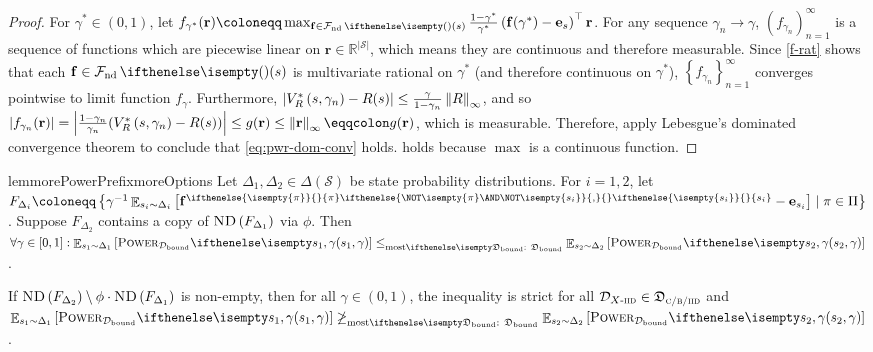 \documentclass{article}
\renewcommand{\abs}[1]{\left|#1\right|}
\newcommand*{\prn}[1]{\left(#1\right)}
\newcommand*{\brx}[1]{\left[#1\right]}
\renewcommand{\set}[1]{\left\{#1\right\}}
\newcommand*{\defeq}{\coloneqq} %
\newcommand*{\eqdef}{\eqqcolon} %
\newcommand*{\reals}{\mathbb{R}}
\newcommand*{\unitvec}[1][s]{\mathbf{e}_{#1}}
\newcommand*{\upsc}[1]{\text{\upshape\textsc{#1}}}
\newcommand*{\St}{\mathcal{S}}
\newcommand*{\rf}{\mathbf{r}} %
\newcommand*{\rewardVS}{\reals^{\abs{\St}}} %
\newcommand*{\D}{\mathcal{D}} %
\newcommand*{\distSet}{\mathfrak{D}}
\newcommand*{\DSetBCiid}{\distSet_{\textsc{c/b/}\iid}}
\newcommand*{\Dbd}{\D_{\text{bound}}}
\newcommand*{\DSetBd}{\distSet_\text{bound}}
\DeclareMathOperator*{\opE}{\mathbb{E}}
\newcommand*{\E}[2]{\opE_{#1}\brx{#2}} %
\newcommand*{\f}{\mathbf{f}} %
\newcommand*{\fpi}[2][\pi]{\f^{
\ifthenelse{\isempty{#1}}{}{#1} %
\ifthenelse{\NOT\isempty{#1} \AND \NOT\isempty{#2}}{,}{} %
\ifthenelse{\isempty{#2}}{}{#2}}} %
\newcommand*{\ND}[1]{\upsc{ND}\prn{#1}}
\newcommand*{\linfty}[1]{\left \lVert#1\right \rVert_\infty}
\newcommand*{\inv}{^{-1}}
\theoremstyle{definition}
\begin{document}
\begin{appendices}
\begin{proof}
For $\gamma^*\in(0,1)$, let $f_{\gamma^*}(\rf)\defeq \max_{\f\in \Fnd(s)} \frac{1-\gamma^*}{\gamma^*}\prn{\f(\gamma^*)-\unitvec}^\top \rf$. For any sequence $\gamma_n\to\gamma$, $\prn{f_{\gamma_n}}_{n=1}^\infty$ is a sequence of functions which are piecewise linear on $\rf \in \rewardVS$, which means they are continuous and therefore measurable. Since \cref{f-rat} shows that each $\f\in\Fnd(s)$ is multivariate rational on $\gamma^*$ (and therefore continuous on $\gamma^*$), $\set{f_{\gamma_n}}_{n=1}^\infty$ converges pointwise to limit function $f_\gamma$. Furthermore,  $\abs{\OptVf{s,\gamma_n}-R(s)}\leq \frac{\gamma}{1-\gamma_n}\linfty{R}$, and so $\abs{f_{\gamma_n}(\rf)}=\abs{\frac{1-\gamma_n}{\gamma_n}(\OptVf{s,\gamma_n}-R(s))}\leq g(\rf)\leq \linfty{\rf}\eqdef g(\rf)$, which is measurable. Therefore, apply Lebesgue's dominated convergence theorem to conclude that \cref{eq:pwr-dom-conv} holds.  holds because $\max$ is a continuous function.
\end{proof}

\begin{restatable}{lem}{morePowerPrefixmoreOptions}\label{lem:more-power-prefix}
Let $\Delta_1,\Delta_2\in \Delta\prn{\St}$ be state probability distributions. For $i=1,2$, let $F_{\Delta_i}\defeq \set{\gamma\inv\E{s_i\sim \Delta_i}{\fpi{s_i}-\unitvec[s_i]}\mid \pi\in\Pi}$. Suppose $F_{\Delta_2}$ contains a copy of $\ND{F_{\Delta_1}}$ via $\phi$. Then $\forall \gamma\in[0,1]:\E{s_1\sim \Delta_1}{\pwr[s_1,\gamma]}\leqMost[][\DSetBd] \E{s_2\sim \Delta_2}{\pwr[s_2,\gamma]}$. 

If $\ND{F_{\Delta_2}}\setminus \phi\cdot \ND{F_{\Delta_1}}$ is non-empty, then for all $\gamma\in(0,1)$, the inequality is strict for all $\Diid\in\DSetBCiid$ and $\E{s_1\sim \Delta_1}{\pwr[s_1,\gamma][\Dbd]}\not\geqMost[][\DSetBd] \E{s_2\sim \Delta_2}{\pwr[s_2,\gamma][\Dbd]}$.


\end{restatable}
\end{appendices}
\end{document}
